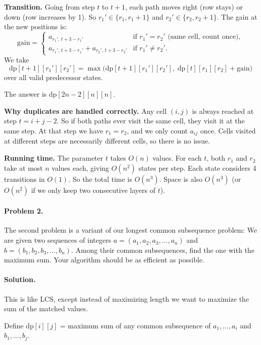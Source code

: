 \documentclass[10pt]{article}
\begin{document}
\textbf{Transition.}  Going from step $t$ to $t+1$, each path moves right (row stays) or down (row increases by 1).  So $r_1' \in \{r_1, r_1 + 1\}$ and $r_2' \in \{r_2, r_2 + 1\}$.  The gain at the new positions is:
\[
\text{gain} = 
\begin{cases}
a_{r_1',\, t+3-r_1'} & \text{if } r_1' = r_2' \text{ (same cell, count once)},\\
a_{r_1',\, t+3-r_1'} + a_{r_2',\, t+3-r_2'} & \text{if } r_1' \neq r_2'.
\end{cases}
\]
We take
\[
\text{dp}[t+1][r_1'][r_2'] = \max\bigl(\text{dp}[t+1][r_1'][r_2'],\; \text{dp}[t][r_1][r_2] + \text{gain}\bigr)
\]
over all valid predecessor states.

The answer is $\text{dp}[2n-2][n][n]$.

\textbf{Why duplicates are handled correctly.}  Any cell $(i,j)$ is always reached at step $t = i + j - 2$.  So if both paths ever visit the same cell, they visit it at the same step.  At that step we have $r_1 = r_2$, and we only count $a_{ij}$ once.  Cells visited at different steps are necessarily different cells, so there is no issue.

\textbf{Running time.}  The parameter $t$ takes $O(n)$ values.  For each $t$, both $r_1$ and $r_2$ take at most $n$ values each, giving $O(n^2)$ states per step.  Each state considers 4 transitions in $O(1)$.  So the total time is $O(n^3)$.  Space is also $O(n^3)$ (or $O(n^2)$ if we only keep two consecutive layers of $t$).


\paragraph{Problem 2.} The second problem is a variant of our longest common subsequence problem:  We are given two sequences of integers $a = (a_1,a_2,a_3,\dots,a_n)$ and $b = (b_1,b_2,b_3,\dots,b_n)$.  Among their common subsequences, find the one with the maximum sum.  Your algorithm should be as efficient as possible.

\paragraph{Solution.}

This is like LCS, except instead of maximizing length we want to maximize the sum of the matched values.

Define $\text{dp}[i][j]$ = maximum sum of any common subsequence of $a_1, \ldots, a_i$ and $b_1, \ldots, b_j$.
\end{document}
